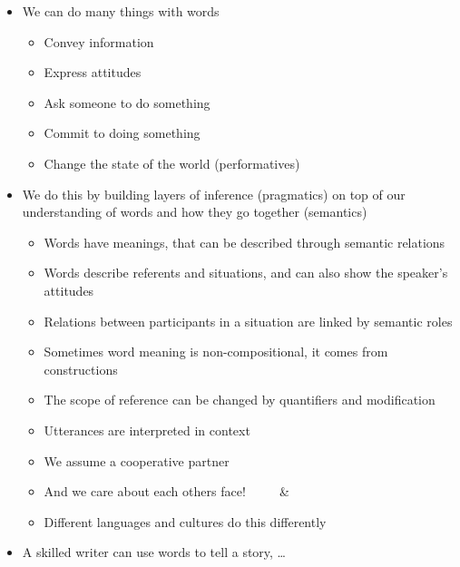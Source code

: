 \documentclass[a4paper,landscape,headrule,footrule,xetex]{foils}
\newcommand{\PF}[1]{\Smiley[#1][green]}
\newcommand{\NF}[1]{\Annoey[#1][red]}
\begin{document}
\begin{itemize} 
\item We can do many things with words
  \begin{itemize} \addtolength{\itemsep}{1ex}
  \item Convey information
  \item Express attitudes
  \item Ask someone to do something
  \item Commit to doing something
  \item Change the state of the world (performatives)
  \end{itemize}
\newpage
\item We do this by building layers of inference (pragmatics) on top
  of our understanding of words and how they go together (semantics)
  \begin{itemize} \addtolength{\itemsep}{0.5ex}
  \item Words have meanings, that can be described through semantic relations
  \item Words describe referents and situations, and can also show the
    speaker's attitudes
  \item Relations between participants in a situation are linked by semantic roles
  \item Sometimes word meaning is non-compositional, it comes from constructions
  \item The scope of reference can be changed by quantifiers and modification
  \item Utterances are interpreted in context
  \item We assume a cooperative partner
  \item And we care about each others face! ~~~~ \PF{1} \& \NF{1}
  \item Different languages and cultures do this differently

  \end{itemize}
\item A skilled writer can use words to tell a story, \ldots
\end{itemize}

\end{document}
